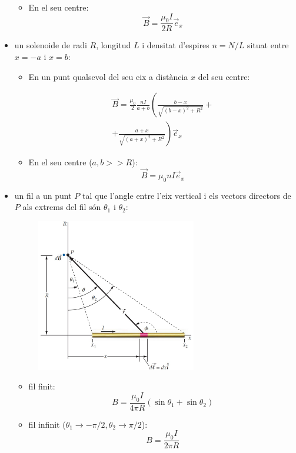 \documentclass[class=article,10pt,crop=false]{standalone}
\begin{document}
\begin{multicols}{2}
\begin{itemize}
\begin{itemize}
        \item En el seu centre: $$\Vec{B}=\frac{\mu_0I}{2R}\Vec{e}_x$$
    \end{itemize}
    \item un solenoide de radi $R$, longitud $L$ i densitat d'espires $n=N/L$ situat entre $x=-a$ i $x=b$:
    \begin{itemize}
        \item En un punt qualsevol del seu eix a distància $x$ del seu centre:
        \begin{footnotesize}
            \begin{multline*} \Vec{B}=\frac{\mu_0}{2}\frac{nI}{a+b}\left(\frac{b-x}{\sqrt{(b-x)^2+R^2}}+\right.\\\left.+\frac{a+x}{\sqrt{(a+x)^2+R^2}}\right)\Vec{e}_x
            \end{multline*}
        \end{footnotesize}
        \item En el seu centre ($a,b>>R$): $$\Vec{B}=\mu_0 nI\Vec{e}_x$$
    \end{itemize}
    \item un fil a un punt $P$ tal que l'angle entre l'eix vertical i els vectors directors de $P$ als extrems del fil són $\theta_1$ i $\theta_2$:\newline
    \begin{figure}[ht]
        \centering
        \includegraphics[width=7cm]{Physics/1st/Electricitat_i_magnetisme/Imatges/fil.jpg} 
    \end{figure}
    \begin{itemize}
        \item fil finit: $$B=\frac{\mu_0I}{4\pi R}(\sin\theta_1+\sin\theta_2)$$
        \item fil infinit ($\theta_1\to-\pi/2,\theta_2\to\pi/2$): $$B=\frac{\mu_0I}{2\pi R}$$
    \end{itemize}

\end{itemize}
\end{multicols}
\end{document}
